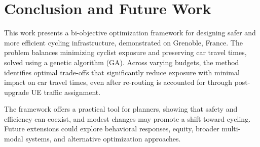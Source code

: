 \documentclass[letterpaper, 10 pt, conference]{ieeeconf}  %
\begin{document}
\section{Conclusion and Future Work}
\label{conclusions}



This work presents a bi-objective optimization framework for designing safer and more efficient cycling infrastructure, demonstrated on Grenoble, France. The problem balances minimizing cyclist exposure and preserving car travel times, solved using a genetic algorithm (GA). Across varying budgets, the method identifies optimal trade-offs that significantly reduce exposure with minimal impact on car travel times, even after re-routing is accounted for through post-upgrade UE traffic assignment.

The framework offers a practical tool for planners, showing that safety and efficiency can coexist, and modest changes may promote a shift toward cycling. Future extensions could explore behavioral responses, equity, broader multi-modal systems, and alternative optimization approaches.





















\end{document}
